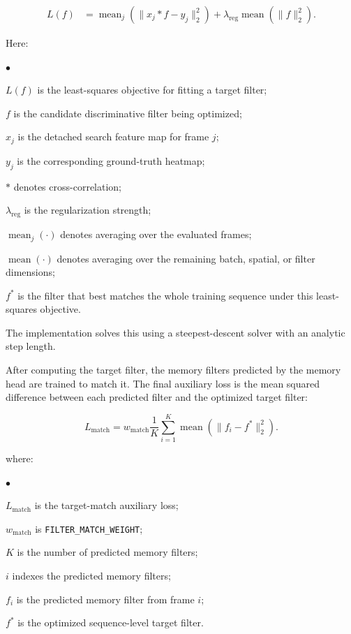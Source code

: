 \documentclass[bachelorthesis]{fer}
\numberwithin{equation}{chapter}
\newcommand{\FormulaNotationWith}[2]{%
    \vspace{-0.6em}
    \noindent\hspace*{1.2em}%
    \begin{minipage}{0.90\textwidth}
        \footnotesize
        #1
        \vspace{0.2em}
        \begin{list}{\(\bullet\)}{
            \setlength{\leftmargin}{1.4em}
            \setlength{\labelwidth}{0.8em}
            \setlength{\labelsep}{0.5em}
            \setlength{\itemsep}{0.05em}
            \setlength{\parsep}{0pt}
            \setlength{\topsep}{0.25em}
            \setlength{\partopsep}{0pt}
        }
            #2
        \end{list}
    \end{minipage}
    \par
    \vspace{0.8em}

}
\newcommand{\FormulaNotation}[1]{\FormulaNotationWith{where:}{#1}}
\begin{document}
    \begin{equation}
        \begin{aligned}
            L(f) &=
            \operatorname{mean}_{j}\left(
            \lVert x_j * f - y_j \rVert_2^2
            \right)
            +
            \lambda_{\mathrm{reg}}
            \operatorname{mean}\left(
            \lVert f \rVert_2^2
            \right).
        \end{aligned}
    \end{equation}
    \FormulaNotationWith{Here:}{
        \item \(L(f)\) is the least-squares objective for fitting a target filter;
        \item \(f\) is the candidate discriminative filter being optimized;
        \item \(x_j\) is the detached search feature map for frame \(j\);
        \item \(y_j\) is the corresponding ground-truth heatmap;
        \item \(*\) denotes cross-correlation;
        \item \(\lambda_{\mathrm{reg}}\) is the regularization strength;
        \item \(\operatorname{mean}_{j}(\cdot)\) denotes averaging over the evaluated frames;
        \item \(\operatorname{mean}(\cdot)\) denotes averaging over the remaining batch, spatial, or filter dimensions;
        \item \(f^*\) is the filter that best matches the whole training sequence under this least-squares objective.
    }
    The implementation
    solves this using a steepest-descent solver with an analytic step length.

    After computing the target filter, the memory filters predicted by the memory head are trained to match it. The final
    auxiliary loss is the mean squared difference between each predicted filter and the optimized target filter:

    \begin{equation}
        L_{\mathrm{match}}
        =
        w_{\mathrm{match}}
        \frac{1}{K}
        \sum_{i=1}^{K}
        \operatorname{mean}\left(
        \lVert f_i - f^* \rVert_2^2
        \right).
    \end{equation}
    \FormulaNotation{
        \item \(L_{\mathrm{match}}\) is the target-match auxiliary loss;
        \item \(w_{\mathrm{match}}\) is \texttt{FILTER\_MATCH\_WEIGHT};
        \item \(K\) is the number of predicted memory filters;
        \item \(i\) indexes the predicted memory filters;
        \item \(f_i\) is the predicted memory filter from frame \(i\);
        \item \(f^*\) is the optimized sequence-level target filter.
    }
\end{document}
